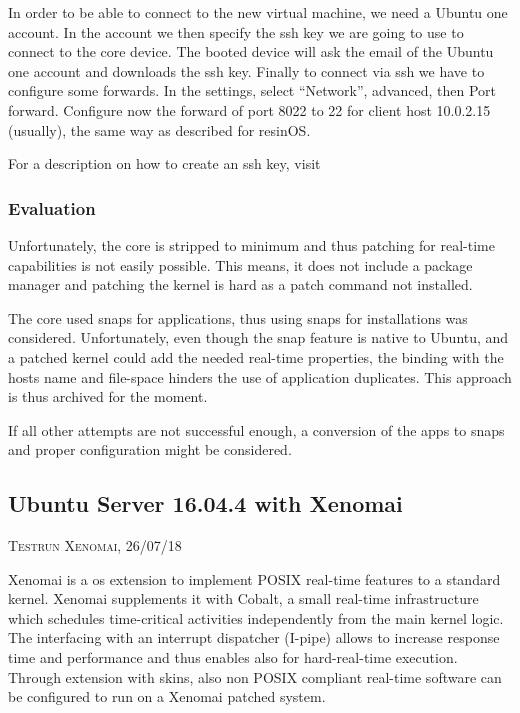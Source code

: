 \documentclass[]{scrartcl}
\begin{document}
In order to be able to connect to the new virtual machine, we need a Ubuntu one account. In the account we then specify the ssh key we are going to use to connect to the core device. The booted device will ask the email of the Ubuntu one account and downloads the ssh key. Finally to connect via ssh we have to configure some forwards. In the settings, select ``Network'', advanced, then Port forward. Configure now the forward of port 8022 to 22 for client host 10.0.2.15 (usually), the same way as described for resinOS.

For a description on how to create an ssh key, visit \cite{atlassian01}

\subsubsection{Evaluation}

Unfortunately, the core is stripped to minimum and thus patching for real-time capabilities is not easily possible. This means, it does not include a package manager and patching the kernel is hard as a patch command not installed.

The core used snaps for applications, thus using snaps for installations was considered. Unfortunately, even though the snap feature is native to Ubuntu, and a patched kernel could add the needed real-time properties, the binding with the hosts name and file-space hinders the use of application duplicates. This approach is thus archived for the moment.

If all other attempts are not successful enough, a conversion of the apps to snaps and proper configuration might be considered.

\subsection{Ubuntu Server 16.04.4 with Xenomai}

{\small\textsc{Testrun Xenomai, 26/07/18} \bigskip}

Xenomai is a os extension to implement POSIX real-time features to a standard kernel. Xenomai supplements it with Cobalt, a small real-time infrastructure which schedules time-critical activities independently from the main kernel logic. The interfacing with an interrupt dispatcher (I-pipe) allows to increase response time and performance and thus enables also for hard-real-time execution. Through extension with skins, also non POSIX compliant real-time software can be configured to run on a Xenomai patched system.
\end{document}
